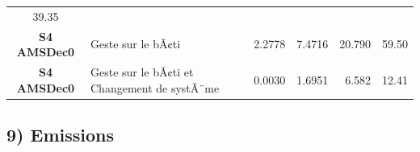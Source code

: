 \documentclass[]{article}
\begin{document}
\begin{longtable}[]{@{}clrrrr@{}}
\begin{minipage}[t]{0.09\columnwidth}
39.35\strut
\end{minipage}\tabularnewline
\begin{minipage}[t]{0.17\columnwidth}\centering\strut
\textbf{S4 AMSDec0}\strut
\end{minipage} & \begin{minipage}[t]{0.29\columnwidth}\raggedright\strut
Geste sur le bÃ¢ti\strut
\end{minipage} & \begin{minipage}[t]{0.09\columnwidth}\raggedleft\strut
2.2778\strut
\end{minipage} & \begin{minipage}[t]{0.09\columnwidth}\raggedleft\strut
7.4716\strut
\end{minipage} & \begin{minipage}[t]{0.09\columnwidth}\raggedleft\strut
20.790\strut
\end{minipage} & \begin{minipage}[t]{0.09\columnwidth}\raggedleft\strut
59.50\strut
\end{minipage}\tabularnewline
\begin{minipage}[t]{0.17\columnwidth}\centering\strut
\textbf{S4 AMSDec0}\strut
\end{minipage} & \begin{minipage}[t]{0.29\columnwidth}\raggedright\strut
Geste sur le bÃ¢ti et Changement de systÃ¨me\strut
\end{minipage} & \begin{minipage}[t]{0.09\columnwidth}\raggedleft\strut
0.0030\strut
\end{minipage} & \begin{minipage}[t]{0.09\columnwidth}\raggedleft\strut
1.6951\strut
\end{minipage} & \begin{minipage}[t]{0.09\columnwidth}\raggedleft\strut
6.582\strut
\end{minipage} & \begin{minipage}[t]{0.09\columnwidth}\raggedleft\strut
12.41\strut
\end{minipage}\tabularnewline
\bottomrule
\end{longtable}

\clearpage
\newpage

\subsection{9) Emissions}\label{emissions}
\end{document}
